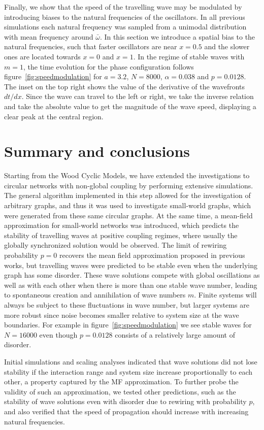 Finally, we show that the speed of the travelling wave may be modulated by introducing biases to the natural frequencies of the
oscillators. In all previous simulations each natural frequency was sampled from a unimodal distribution with mean frequency around
$\bar{\omega}$. In this section we introduce a spatial bias to the natural frequencies, such that faster oscillators are near $x=0.5$
and the slower ones are located towards $x=0$ and $x=1$. In the regime of stable waves with $m=1$, the time evolution for the phase
configuration follows figure~\ref{fig:speedmodulation} for $a=3.2$, $N=8000$, $\alpha=0.038$ and $p=0.0128$. The inset on the top right
shows the value of the derivative of the wavefronts $dt/dx$. Since the wave can travel to the left or right, we take the inverse
relation and take the absolute value to get the magnitude of the wave speed, displaying a clear peak at the central region.

\section{Summary and conclusions}

Starting from the Wood Cyclic Models, we have extended the investigations to circular networks with non-global coupling by performing
extensive simulations. The general algorithm implemented in this step allowed for the investigation of arbitrary graphs, and thus it
was used to investigate small-world graphs, which were generated from these same circular graphs. At the same time, a mean-field
approximation for small-world networks was introduced, which predicts the stability of travelling waves at positive coupling regimes,
where usually the globally synchronized solution would be observed. The limit of rewiring probability $p=0$ recovers the mean field
approximation proposed in previous works, but travelling waves were predicted to be stable even when the underlying graph has some
disorder. These wave solutions compete with global oscillations as well as with each other when there is more than one stable wave
number, leading to spontaneous creation and annihilation of wave numbers $m$. Finite systems will always be subject to these
fluctuations in wave number, but larger systems are more robust since noise becomes smaller relative to system size at the wave
boundaries. For example in figure~\ref{fig:speedmodulation} we see stable waves for $N=16000$ even though $p=0.0128$ consists of a
relatively large amount of disorder.

Initial simulations and scaling analyses indicated that wave solutions did not lose stability if the interaction range and system size
increase proportionally to each other, a property captured by the MF approximation. To further probe the validity of
such an approximation, we tested other predictions, such as the stability of wave solutions even with disorder due to
 rewiring with probability $p$, and also verified that the speed of propagation should increase with increasing natural frequencies.

